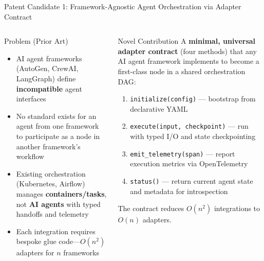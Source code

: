 \begin{frame}{\fontsize{9}{11}\selectfont Patent Candidate 1: Framework-Agnostic Agent Orchestration via Adapter Contract}
  \vspace{-0.3cm}

  \fontsize{5.5}{6.5}\selectfont
  \begin{columns}[T]
    \begin{alertblock}{\fontsize{5.5}{6.5}\selectfont Problem (Prior Art)}
      \fontsize{5.5}{6.5}\selectfont
      \begin{itemize}
        \setlength{\itemsep}{0pt}
        \item AI agent frameworks (AutoGen, CrewAI, LangGraph) define
              \textbf{incompatible} agent interfaces
        \item No standard exists for an agent from one framework to participate
              as a node in another framework's workflow
        \item Existing orchestration (Kubernetes, Airflow) manages
              \textbf{containers/tasks}, not \textbf{AI agents} with typed
              handoffs and telemetry
        \item Each integration requires bespoke glue code---$O(n^2)$ adapters
              for $n$ frameworks
      \end{itemize}
    \end{alertblock}

    \begin{block}{\fontsize{5.5}{6.5}\selectfont Novel Contribution}
      \fontsize{5.5}{6.5}\selectfont
      A \textbf{minimal, universal adapter contract} (four methods) that any AI
      agent framework implements to become a first-class node in a shared
      orchestration DAG:
      \begin{enumerate}
        \setlength{\itemsep}{0pt}
        \item \texttt{initialize(config)} --- bootstrap from declarative YAML
        \item \texttt{execute(input, checkpoint)} --- run with typed I/O and
              state checkpointing
        \item \texttt{emit\_telemetry(span)} --- report execution metrics via
              OpenTelemetry
        \item \texttt{status()} --- return current agent state and metadata
              for introspection
      \end{enumerate}
      The contract reduces $O(n^2)$ integrations to $O(n)$ adapters.
    \end{block}


\end{columns}
\end{frame}
